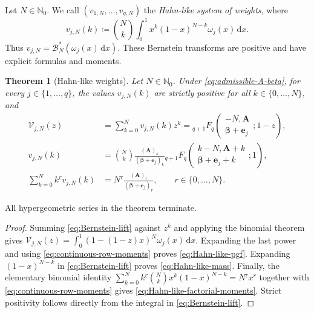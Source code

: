 \documentclass[10pt]{amsart}
\newcommand{\Nzero}{\mathbb N_0}
\newcommand{\dd}{\,\mathrm d}
\newcommand{\A}{\boldsymbol A}
\newcommand{\bbeta}{\boldsymbol\beta}
\newcommand{\ee}{\boldsymbol e}
\newcommand{\fall}[2]{#1^{\underline{#2}}}
\newcommand{\pFq}[5]{{}_{#1}F_{#2}\!\left(\begin{matrix}#3\\#4\end{matrix};#5\right)}
\theoremstyle{plain}
\newtheorem{theorem}{Theorem}[section]
\theoremstyle{definition}
\theoremstyle{remark}
\begin{document}
Let \(N\in\Nzero\). We call \((v_{1,N},\ldots,v_{q,N})\) the
\emph{Hahn-like system of weights}, where
\begin{equation}
 v_{j,N}(k)\coloneq\binom Nk\int_0^1
 x^k(1-x)^{N-k}\omega_j(x)\dd x.
 \label{eq:Bernstein-lift}
\end{equation}
Thus \(v_{j,N}=\mathscr B_N^*(\omega_j(x)\dd x)\).  These Bernstein
transforms are positive and have explicit formulas and
moments.

\begin{theorem}[Hahn-like weights]
\label{thm:Hahn-like-rows}
Let \(N\in\Nzero\). Under \eqref{eq:admissible-A-beta}, for every
\(j\in\{1,\ldots,q\}\), the values \(v_{j,N}(k)\) are strictly positive
for all \(k\in\{0,\ldots,N\}\), and
\begin{align}
 \mathcal V_{j,N}(z)
 &=\sum_{k=0}^Nv_{j,N}(k)z^k
 =\pFq{q+1}{q}{-N,\A}{\bbeta+\ee_j}{1-z},
 \label{eq:Hahn-like-pgf}\\
 v_{j,N}(k)
 &=\binom Nk\frac{(\A)_k}{(\bbeta+\ee_j)_k}
 \pFq{q+1}{q}
 {k-N,\A+k}{\bbeta+\ee_j+k}{1},
 \label{eq:Hahn-like-mass}\\
 \sum_{k=0}^N\fall{k}{r}v_{j,N}(k)
 &=\fall{N}{r}\frac{(\A)_r}{(\bbeta+\ee_j)_r},
 \qquad r\in\{0,\ldots,N\}.
 \label{eq:Hahn-like-factorial-moments}
\end{align}
\end{theorem}

All hypergeometric series in the theorem terminate.

\begin{proof}
Summing \eqref{eq:Bernstein-lift} against \(z^k\) and applying the binomial
theorem gives
\(\mathcal V_{j,N}(z)=
\int_0^1(1-(1-z)x)^N\omega_j(x)\dd x\).
Expanding the last power and using \eqref{eq:continuous-row-moments} proves
\eqref{eq:Hahn-like-pgf}. Expanding \((1-x)^{N-k}\) in
\eqref{eq:Bernstein-lift} proves \eqref{eq:Hahn-like-mass}. Finally,
the elementary binomial identity
\(\sum_{k=0}^N\fall{k}{r}\binom Nkx^k(1-x)^{N-k}
=\fall{N}{r}x^r\)
together with \eqref{eq:continuous-row-moments} gives
\eqref{eq:Hahn-like-factorial-moments}. Strict positivity follows directly
from the integral in \eqref{eq:Bernstein-lift}.
\end{proof}
\end{document}
